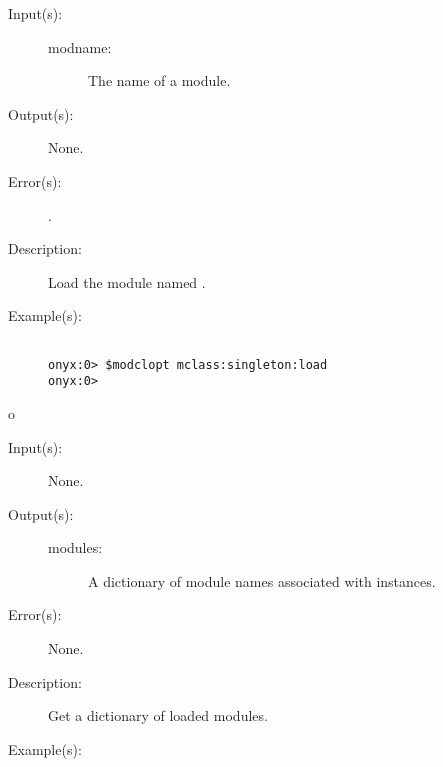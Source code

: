 \begin{description}
\label{mclass:load}
\item[{\onyxop{modname}{load}{--}}: ]
	\begin{description}\item[]
	\item[Input(s): ]
		\begin{description}\item[]
		\item[modname: ]
			The name of a module.
		\end{description}
	\item[Output(s): ] None.
	\item[Error(s): ]
		\begin{description}\item[]
		\item[.]
		\end{description}
	\item[Description: ]
		Load the module named .
	\item[Example(s): ]\begin{verbatim}

onyx:0> $modclopt mclass:singleton:load
onyx:0> 
		\end{verbatim}
	\end{description}
\label{mclass:modules}
o\item[{\onyxop{--}{modules}{modules}}: ]
	\begin{description}\item[]
	\item[Input(s): ] None.
	\item[Output(s): ]
		\begin{description}\item[]
		\item[modules: ]
			A dictionary of module names associated with
			 instances.
		\end{description}
	\item[Error(s): ] None.
	\item[Description: ]
		Get a dictionary of loaded modules.
	\item[Example(s): ]\begin{verbatim}


\end{verbatim}
\end{description}
\end{description}
